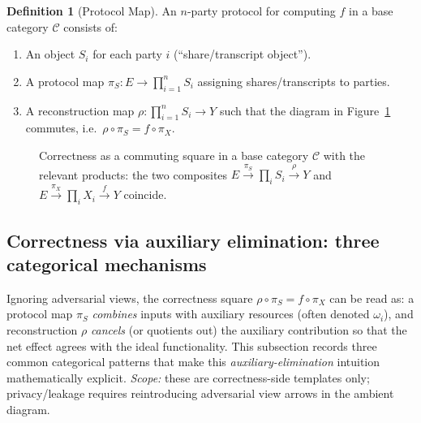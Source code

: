 \documentclass[11pt,a4paper]{article}
\theoremstyle{definition}
\newtheorem{definition}{Definition}[section]
\theoremstyle{plain}
\begin{document}
\begin{definition}[Protocol Map]
\label{def:protocol-map-embeddings-note}
An $n$-party protocol for computing $f$ in a base category $\mathcal{C}$ consists of:
\begin{enumerate}
    \item An object $S_i$ for each party $i$ (``share/transcript object'').
    \item A protocol map $\pi_S: E \to \prod_{i=1}^n S_i$ assigning shares/transcripts to parties.
    \item A reconstruction map $\rho: \prod_{i=1}^n S_i \to Y$ such that the diagram in Figure~\ref{fig:protocol-correctness} commutes, i.e.\ $\rho \circ \pi_S = f \circ \pi_X$.
\end{enumerate}
\end{definition}

\begin{figure}[ht]
\centering
{}
\caption{Correctness as a commuting square in a base category $\mathcal{C}$ with the relevant products: the two composites $E \xrightarrow{\pi_S} \prod_i S_i \xrightarrow{\rho} Y$ and $E \xrightarrow{\pi_X} \prod_i X_i \xrightarrow{f} Y$ coincide.}
\label{fig:protocol-correctness}
\end{figure}

\subsection{Correctness via auxiliary elimination: three categorical mechanisms}
\label{subsec:combine-cancel}
Ignoring adversarial views, the correctness square $\rho\circ \pi_S=f\circ \pi_X$ can be read as: a protocol map $\pi_S$ \emph{combines} inputs with auxiliary resources (often denoted $\omega_i$), and reconstruction $\rho$ \emph{cancels} (or quotients out) the auxiliary contribution so that the net effect agrees with the ideal functionality.
This subsection records three common categorical patterns that make this \emph{auxiliary-elimination} intuition mathematically explicit.
\emph{Scope:} these are correctness-side templates only; privacy/leakage requires reintroducing adversarial view arrows in the ambient diagram.
\end{document}
